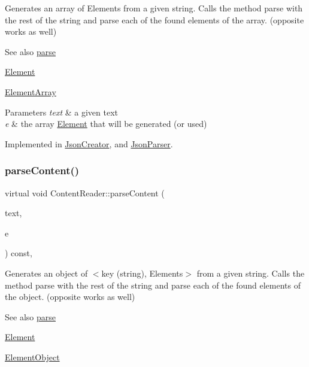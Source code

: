 Generates an array of Elements from a given string. Calls the method parse with the rest of the string and parse each of the found elements of the array. (opposite works as well) \begin{DoxySeeAlso}{See also}
\mbox{\hyperlink{classContentReader_a7fff2e63a2e8fa216665604f69974e1d}{parse}} 

\mbox{\hyperlink{classElement}{Element}} 

\mbox{\hyperlink{classElementArray}{Element\+Array}}
\end{DoxySeeAlso}

\begin{DoxyParams}{Parameters}
{\em text} & a given text \\
\hline
{\em e} & the array \mbox{\hyperlink{classElement}{Element}} that will be generated (or used) \\
\hline
\end{DoxyParams}


Implemented in \mbox{\hyperlink{classJsonCreator_a694669d359eb73890a9e9f247c4ebab4}{Json\+Creator}}, and \mbox{\hyperlink{classJsonParser_aa728c443b247b83cdf6cedb406d8940d}{Json\+Parser}}.

\mbox{\label{classContentReader_a59a8de2bf3436e46b4d029a9b3c3c9da}} 
\subsubsection{\texorpdfstring{parse\+Content()}{parseContent()}\hspace{0.1cm}{\footnotesize\ttfamily [5/6]}}
{\footnotesize\ttfamily virtual void Content\+Reader\+::parse\+Content (\begin{DoxyParamCaption}\item[{std\+::string \&}]{text,  }\item[{\mbox{\hyperlink{classElementObject}{Element\+Object}} $\ast$}]{e }\end{DoxyParamCaption}) const\hspace{0.3cm}{\ttfamily [pure virtual]}, {\ttfamily [inherited]}}

Generates an object of $<$key (string), Elements$>$ from a given string. Calls the method parse with the rest of the string and parse each of the found elements of the object. (opposite works as well) \begin{DoxySeeAlso}{See also}
\mbox{\hyperlink{classContentReader_a7fff2e63a2e8fa216665604f69974e1d}{parse}} 

\mbox{\hyperlink{classElement}{Element}} 

\mbox{\hyperlink{classElementObject}{Element\+Object}}
\end{DoxySeeAlso}

